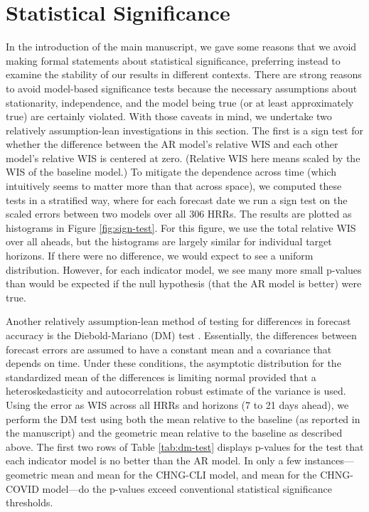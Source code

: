 \section{Statistical Significance}

In the introduction of the main manuscript, we gave some reasons that we avoid
making formal statements about statistical significance, preferring instead to
examine the stability of our results in different contexts.  There are strong
reasons to avoid model-based significance tests because the necessary
assumptions about stationarity, independence, and the model being true (or at
least approximately true) are certainly violated.  With those caveats in mind,
we undertake two relatively assumption-lean investigations in this section.  The
first is a sign test for whether the difference between the AR model’s relative
WIS and each other model’s relative WIS is centered at zero.  (Relative WIS here
means scaled by the WIS of the baseline model.)  To mitigate the dependence 
across time (which intuitively seems to matter more than that across space), we
computed these tests in a stratified way, where for each forecast date we run a
sign test on the scaled errors between two models over all 306 HRRs.  The
results are plotted as histograms in Figure \ref{fig:sign-test}.  For this
figure, we use the total relative WIS over all aheads, but the histograms are
largely similar for individual target horizons. If there were no difference, we
would expect to see a uniform distribution. However, for each indicator model, 
we see many more small p-values than would be expected if the null hypothesis
(that the AR model is better) were true. 

Another relatively assumption-lean method of testing for differences in forecast
accuracy is the Diebold-Mariano (DM) test \cite{Diebold:2002, Diebold:2015,
Harvey:1997}. Essentially, the differences between forecast errors are assumed
to have a constant mean and a covariance that depends on time.  Under these
conditions, the asymptotic distribution for the standardized mean of the
differences is limiting normal provided that a heteroskedasticity and
autocorrelation robust estimate of the variance is used.  Using the error as WIS
across all HRRs and horizons (7 to 21 days ahead), we perform the DM test using
both the mean relative to the baseline (as reported in the manuscript) and the
geometric mean relative to the baseline as described above.  The first two rows
of Table \ref{tab:dm-test} displays p-values for the test that each indicator
model is no better than the AR model.  In only a few instances---geometric mean
and mean for the CHNG-CLI model, and mean for the CHNG-COVID model---do the
p-values exceed conventional statistical significance thresholds. 

